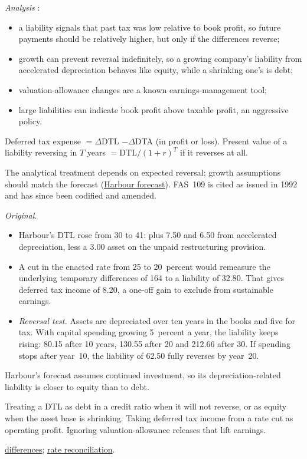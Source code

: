 \begin{qfmethod}
\emph{Analysis} \citep[pp.~370--373]{financial-statement-analysis-2009}:
\begin{itemize}
\item a liability signals that past tax was low relative to book profit, so future payments should be relatively higher, but only if the differences reverse;
\item growth can prevent reversal indefinitely, so a growing company's liability from accelerated depreciation behaves like equity, while a shrinking one's is debt;
\item valuation-allowance changes are a known earnings-management tool;
\item large liabilities can indicate book profit above taxable profit, an aggressive policy.
\end{itemize}

 Deferred tax expense $=\Delta$DTL $-\Delta$DTA (in profit or loss). Present value of a liability reversing in $T$ years $=\text{DTL}/(1+r)^{T}$ if it reverses at all.

 The analytical treatment depends on expected reversal; growth assumptions should match the forecast (\hyperref[ex:harbour-pro-forma-model]{Harbour forecast}). FAS~109 is cited as issued in 1992 and has since been codified and amended.

 \emph{Original.}
\begin{itemize}
\item Harbour's DTL rose from 30 to 41: plus 7.50 and 6.50 from accelerated depreciation, less a 3.00 asset on the unpaid restructuring provision.
\item A cut in the enacted rate from 25 to 20~percent would remeasure the underlying temporary differences of 164 to a liability of 32.80. That gives deferred tax income of 8.20, a one-off gain to exclude from sustainable earnings.
\item \emph{Reversal test.} Assets are depreciated over ten years in the books and five for tax. With capital spending growing 5~percent a year, the liability keeps rising: 80.15 after 10 years, 130.55 after 20 and 212.66 after 30. If spending stops after year~10, the liability of 62.50 fully reverses by year~20.
\end{itemize}
Harbour's forecast assumes continued investment, so its depreciation-related liability is closer to equity than to debt.

 Treating a DTL as debt in a credit ratio when it will not reverse, or as equity when the asset base is shrinking. Taking deferred tax income from a rate cut as operating profit. Ignoring valuation-allowance releases that lift earnings.

 \hyperref[def:accounting-taxable-profit-differences]{differences}; \hyperref[meth:tax-rate-measures]{rate reconciliation}.

\end{qfmethod}

